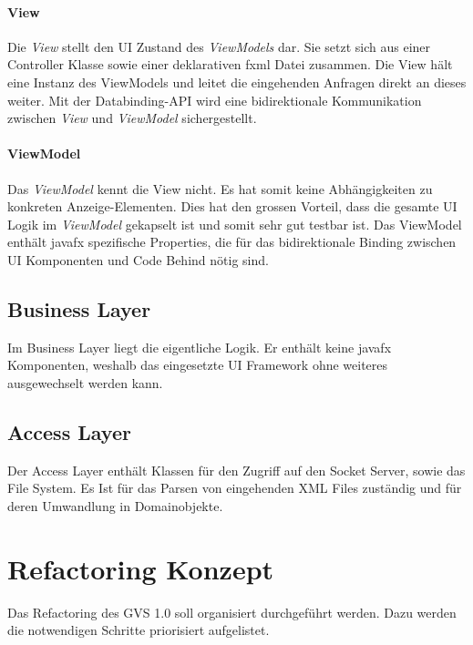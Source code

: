 \documentclass[11pt,a4paper,english,oneside]{book}
\numberwithin{equation}{chapter}
\begin{document}
	\paragraph{View}
	Die \textit{View} stellt den UI Zustand des \textit{ViewModels} dar. Sie setzt sich aus einer Controller Klasse sowie einer deklarativen \gls{fxml} Datei zusammen. Die View hält eine Instanz des ViewModels und leitet die eingehenden Anfragen direkt an dieses weiter. Mit der Databinding-API wird eine bidirektionale Kommunikation zwischen \textit{View} und \textit{ViewModel} sichergestellt. 
	
	\paragraph{ViewModel}
	Das \textit{ViewModel} kennt die View nicht. Es hat somit keine Abhängigkeiten zu konkreten Anzeige-Elementen. Dies hat den grossen Vorteil, dass die gesamte UI Logik im \textit{ViewModel} gekapselt ist und somit sehr gut testbar ist. Das ViewModel enthält \gls{javafx} spezifische Properties, die für das bidirektionale Binding zwischen UI Komponenten und Code Behind nötig sind.
	
	\subsection{Business Layer}
	Im Business Layer liegt die eigentliche Logik. Er enthält keine \gls{javafx} Komponenten, weshalb das eingesetzte UI Framework ohne weiteres ausgewechselt werden kann. 
	
	\subsection{Access Layer}
	Der Access Layer enthält Klassen für den Zugriff auf den Socket Server, sowie das File System. Es Ist für das Parsen von eingehenden XML Files zuständig und für deren Umwandlung in Domainobjekte.

	\section{Refactoring Konzept} \label{sec:refactroing-concept}
	Das Refactoring des GVS 1.0 soll organisiert durchgeführt werden. Dazu werden die notwendigen Schritte priorisiert aufgelistet.
		
\end{document}
